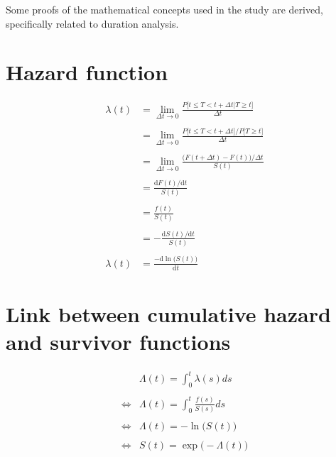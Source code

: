 \documentclass[
]{book}
\begin{document}
Some proofs of the mathematical concepts used in the study are derived, specifically related to duration analysis.

\hypertarget{hazard-function}{%
\section*{Hazard function}\label{hazard-function}}

\begin{equation}    
  \begin{aligned}
  \lambda(t) & = \lim_{\Delta t \to 0} \frac{P\big[t \leq T < t + \Delta t | T \geq t \big]}{\Delta t} \\\\
  & = \lim_{\Delta t \to 0} \frac{P\big[t \leq T < t + \Delta t \big] / P\big[T \geq t  \big]}{\Delta t} \\\\
  & = \lim_{\Delta t \to 0} \frac{\big(F(t+\Delta t)-F(t)\big) / \Delta t}{S(t)} \\\\
  & = \frac{\text{d} F(t) / \text{d} t}{S(t)} \\\\
  & = \frac{f(t)}{S(t)} \\\\
  & = - \frac{\text{d}S(t) / \text{d} t}{S(t)} \\\\
  \lambda(t) & = \frac{-\text{d} \ln \big(S(t)\big)}{\text{d} t}
  \end{aligned}
  \label{eq:hazfunproof}
\end{equation}

\hypertarget{link-between-cumulative-hazard-and-survivor-functions}{%
\section*{Link between cumulative hazard and survivor functions}\label{link-between-cumulative-hazard-and-survivor-functions}}

\begin{equation}
  \begin{aligned}
       & \Lambda(t) = \int_{0}^{t} \lambda(s)ds \\\\
  \iff & \Lambda(t) = \int_{0}^{t} \frac{f(s)}{S(s)}ds \\\\
  \iff & \Lambda(t) = -\ln \big(S(t)\big) \\\\
  \iff & S(t) = \exp \big(-\Lambda(t)\big)
  \end{aligned}
  \label{eq:linksurvcumhaz}
\end{equation}
\end{document}
